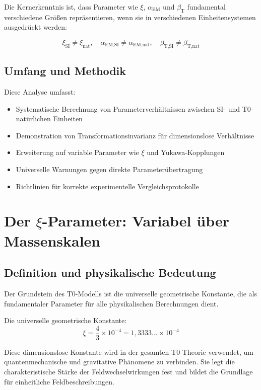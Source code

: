 \documentclass[12pt,a4paper]{article}
\newcommand{\xipar}{\xi}
\newcommand{\alphaEMSI}{\alpha_{\text{EM,SI}}}
\newcommand{\alphaEMnat}{\alpha_{\text{EM,nat}}}
\newcommand{\betaTSI}{\beta_{\text{T,SI}}}
\newcommand{\betaTnat}{\beta_{\text{T,nat}}}
\begin{document}
	Die Kernerkenntnis ist, dass Parameter wie $\xipar$, $\alpha_{\text{EM}}$ und $\beta_{\text{T}}$ fundamental verschiedene Größen repräsentieren, wenn sie in verschiedenen Einheitensystemen ausgedrückt werden:
	
	$$\xipar_{\text{SI}} \neq \xipar_{\text{nat}}, \quad \alphaEMSI \neq \alphaEMnat, \quad \betaTSI \neq \betaTnat$$
	
	\subsection{Umfang und Methodik}
	\label{subsec:umfang}
	
	Diese Analyse umfasst:
	\begin{itemize}
		\item Systematische Berechnung von Parameterverhältnissen zwischen SI- und T0-natürlichen Einheiten
		\item Demonstration von Transformationsinvarianz für dimensionslose Verhältnisse
		\item Erweiterung auf variable Parameter wie $\xipar$ und Yukawa-Kopplungen
		\item Universelle Warnungen gegen direkte Parameterübertragung
		\item Richtlinien für korrekte experimentelle Vergleichsprotokolle
	\end{itemize}
	
	\section{Der $\xipar$-Parameter: Variabel über Massenskalen}
	\label{sec:xi_parameter}
	
	\subsection{Definition und physikalische Bedeutung}

	
	Der Grundstein des T0-Modells ist die universelle geometrische Konstante, die als fundamentaler Parameter für alle physikalischen Berechnungen dient.
	

		Die universelle geometrische Konstante:
		\begin{equation}
			\xi = \frac{4}{3} \times 10^{-4} = 1,3333... \times 10^{-4}
		\end{equation}

	
	Diese dimensionslose Konstante wird in der gesamten T0-Theorie verwendet, um quantenmechanische und gravitative Phänomene zu verbinden. Sie legt die charakteristische Stärke der Feldwechselwirkungen fest und bildet die Grundlage für einheitliche Feldbeschreibungen.
	
\end{document}
